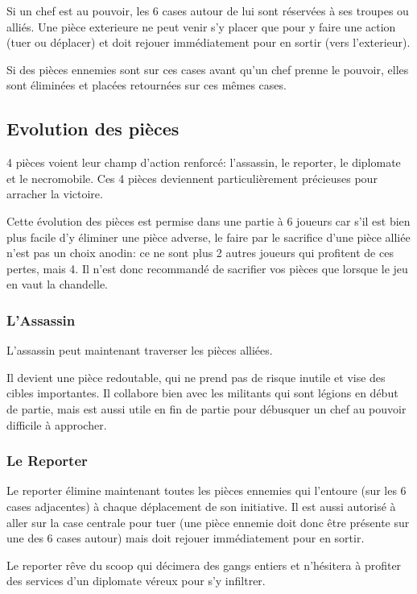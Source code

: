 \documentclass{article}
\begin{document}
Si un chef est au pouvoir, les 6 cases autour de lui sont réservées à ses troupes ou alliés.
Une pièce exterieure ne peut venir s'y placer que pour y faire une action (tuer ou déplacer) et doit rejouer immédiatement pour en sortir (vers l'exterieur).

Si des pièces ennemies sont sur ces cases avant qu'un chef prenne le pouvoir, elles sont éliminées et placées retournées sur ces mêmes cases.

\newpage

\subsection{Evolution des pièces}

4 pièces voient leur champ d'action renforcé: l'assassin, le reporter, le diplomate et le necromobile. Ces 4 pièces deviennent particulièrement précieuses pour arracher la victoire.

Cette évolution des pièces est permise dans une partie à 6 joueurs car s'il est bien plus facile d'y éliminer une pièce adverse, le faire par le sacrifice d'une pièce alliée n'est pas un choix anodin:
ce ne sont plus 2 autres joueurs qui profitent de ces pertes, mais 4.
Il n'est donc recommandé de sacrifier vos pièces que lorsque le jeu en vaut la chandelle.

\subsubsection{L'Assassin}
L'assassin peut maintenant traverser les pièces alliées.

Il devient une pièce redoutable, qui ne prend pas de risque inutile et vise des cibles importantes.
Il collabore bien avec les militants qui sont légions en début de partie, mais est aussi utile en fin de partie pour débusquer un chef au pouvoir difficile à approcher.

\subsubsection{Le Reporter}
Le reporter élimine maintenant toutes les pièces ennemies qui l'entoure (sur les 6 cases adjacentes) à chaque déplacement de son initiative.
Il est aussi autorisé à aller sur la case centrale pour tuer (une pièce ennemie doit donc être présente sur une des 6 cases autour) mais doit rejouer immédiatement pour en sortir.

Le reporter rêve du scoop qui décimera des gangs entiers et n'hésitera à profiter des services d'un diplomate véreux pour s'y infiltrer.
\end{document}
